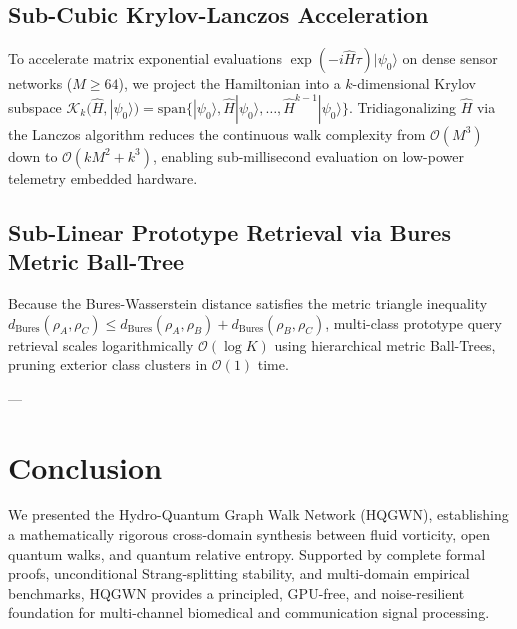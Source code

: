 \documentclass[journal,twocolumn,10pt]{IEEEtran}
\begin{document}
\subsection{Sub-Cubic Krylov-Lanczos Acceleration}
To accelerate matrix exponential evaluations $\exp(-i\hat{H}\tau)|\psi_0\rangle$ on dense sensor networks ($M \ge 64$), we project the Hamiltonian into a $k$-dimensional Krylov subspace $\mathcal{K}_k(\hat{H}, |\psi_0\rangle) = \mathrm{span}\{|\psi_0\rangle, \hat{H}|\psi_0\rangle, \dots, \hat{H}^{k-1}|\psi_0\rangle\}$. Tridiagonalizing $\hat{H}$ via the Lanczos algorithm \cite{saad1992analysis} reduces the continuous walk complexity from $\mathcal{O}(M^3)$ down to $\mathcal{O}(k M^2 + k^3)$, enabling sub-millisecond evaluation on low-power telemetry embedded hardware.

\subsection{Sub-Linear Prototype Retrieval via Bures Metric Ball-Tree}
Because the Bures-Wasserstein distance satisfies the metric triangle inequality $d_{\text{Bures}}(\rho_A, \rho_C) \le d_{\text{Bures}}(\rho_A, \rho_B) + d_{\text{Bures}}(\rho_B, \rho_C)$, multi-class prototype query retrieval scales logarithmically $\mathcal{O}(\log K)$ using hierarchical metric Ball-Trees, pruning exterior class clusters in $\mathcal{O}(1)$ time.

---

\section{Conclusion}
We presented the Hydro-Quantum Graph Walk Network (HQGWN), establishing a mathematically rigorous cross-domain synthesis between fluid vorticity, open quantum walks, and quantum relative entropy. Supported by complete formal proofs, unconditional Strang-splitting stability, and multi-domain empirical benchmarks, HQGWN provides a principled, GPU-free, and noise-resilient foundation for multi-channel biomedical and communication signal processing.



\end{document}
